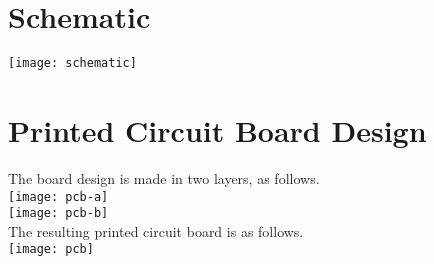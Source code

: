 \section{Schematic}
\texttt{[image: schematic]}
\newpage
\section{Printed Circuit Board Design}

\centering
The board design is made in two layers, as follows.\\
\texttt{[image: pcb-a]}\\
\centering
\texttt{[image: pcb-b]}\\

The resulting printed circuit board is as follows.\\

\centering
\texttt{[image: pcb]}\\
